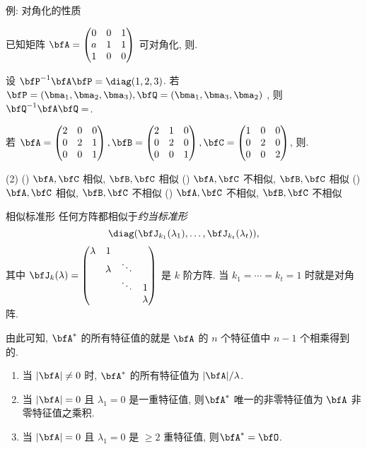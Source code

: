 \begin{frame}{例: 对角化的性质}\small
\beqskip{4pt}
	\onslide<+->
	\begin{exercise}
		已知矩阵 $\bfA=\begin{pmatrix}
			0&0&1\\
			a&1&1\\
			1&0&0
		\end{pmatrix}$ 可对角化, 则.
	\end{exercise}
	\onslide<+->
	\begin{exercise}
		设 $\bfP^{-1}\bfA\bfP=\diag(1,2,3)$.
		若 $\bfP=(\bma_1,\bma_2,\bma_3),\bfQ=(\bma_1,\bma_3,\bma_2)$	, 则 $\bfQ^{-1}\bfA\bfQ=$\fillblankframe[2cm]{$\diag(1,3,2)$}.
	\end{exercise}
	\onslide<+->
	\begin{exercise}
		若 $\bfA=\begin{pmatrix}
			2&0&0\\
			0&2&1\\
			0&0&1
		\end{pmatrix},\bfB=\begin{pmatrix}
			2&1&0\\
			0&2&0\\
			0&0&1
		\end{pmatrix},\bfC=\begin{pmatrix}
			1&0&0\\
			0&2&0\\
			0&0&2
		\end{pmatrix}$, 则\fillbraceframe{C}.
		\begin{taskschoice}(2)
			() $\bfA,\bfC$ 相似, $\bfB,\bfC$ 相似
			() $\bfA,\bfC$ 不相似, $\bfB,\bfC$ 相似
			() $\bfA,\bfC$ 相似, $\bfB,\bfC$ 不相似
			() $\bfA,\bfC$ 不相似, $\bfB,\bfC$ 不相似
		\end{taskschoice}
	\end{exercise}
\endgroup
\end{frame}


\begin{frame}{相似标准形\noexer}
	\onslide<+->
	任何方阵都相似于\emph{约当标准形}
	\[\diag(\bfJ_{k_1}(\lambda_1),\dots,\bfJ_{k_t}(\lambda_t)),\]
	其中 $\bfJ_k(\lambda)=\begin{pmatrix}
		\lambda&1&&\\
		&\lambda&\ddots&\\
		&&\ddots&1\\
		&&&\lambda
	\end{pmatrix}$ 是 $k$ 阶方阵.
	\onslide<+->
	当 $k_1=\cdots=k_t=1$ 时就是对角阵.

	\onslide<+->
	由此可知, \alert{$\bfA^*$ 的所有特征值的就是 $\bfA$ 的 $n$ 个特征值中 $n-1$ 个相乘得到的}.
	\begin{enumerate}
		\item 当 $|\bfA|\neq0$ 时, $\bfA^*$ 的所有特征值为 $|\bfA|/\lambda$.
		\item 当 $|\bfA|=0$ 且 $\lambda_1=0$ 是一重特征值, 则$\bfA^*$ 唯一的非零特征值为 $\bfA$ 非零特征值之乘积.
		\item 当 $|\bfA|=0$ 且 $\lambda_1=0$ 是 $\ge2$ 重特征值, 则$\bfA^*=\bfO$.
	\end{enumerate}
\end{frame}


